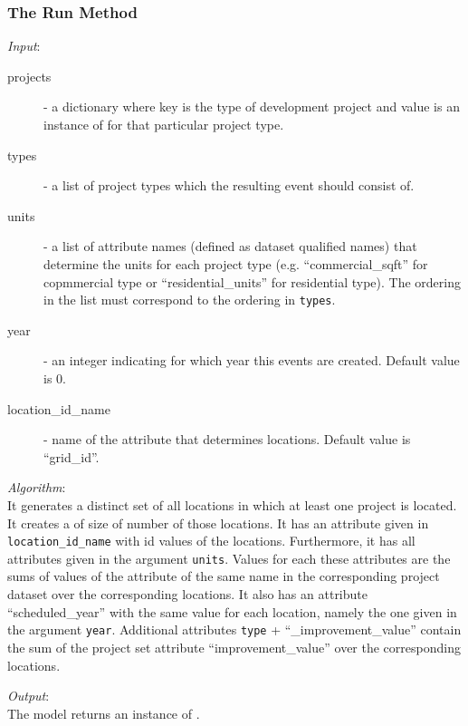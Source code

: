 \subsubsection{The Run Method}
%
{\it Input}:
\begin{description}
\item[projects] - a dictionary where key is the type of development
  project and value is an instance of  for that
  particular project type.
\item[types] - a list of project types which the resulting event should
  consist of.
\item[units] - a list of attribute names (defined as dataset qualified names)
  that determine the units for each project type (e.g. ``commercial_sqft'' for
  copmmercial type or ``residential_units'' for residential type). The
  ordering in the list must correspond to the ordering in \verb|types|.
\item[year] - an integer indicating for which year this events are
  created. Default value is 0.
\item[location_id_name] - name of the attribute that determines
  locations. Default value is ``grid_id''.
\end{description}

{\it Algorithm}:\\[1mm]
It generates a distinct set of all locations in which at least one project is
located. It creates a  of size of number of those
locations. It has an attribute given in \verb|location_id_name| with id values
of the locations. Furthermore, it has all attributes given in the argument
\verb|units|. Values for each these attributes are the sums of values of the
attribute of the same name in the corresponding project dataset over the
corresponding locations. It also has an attribute ``scheduled_year'' with the
same value for each location, namely the one given in the argument
\verb|year|. Additional attributes \verb|type| + ``_improvement_value''
contain the sum of the project set attribute ``improvement_value'' over the
corresponding locations.

{\it Output}:~\\[1mm]
The model returns an instance of .

